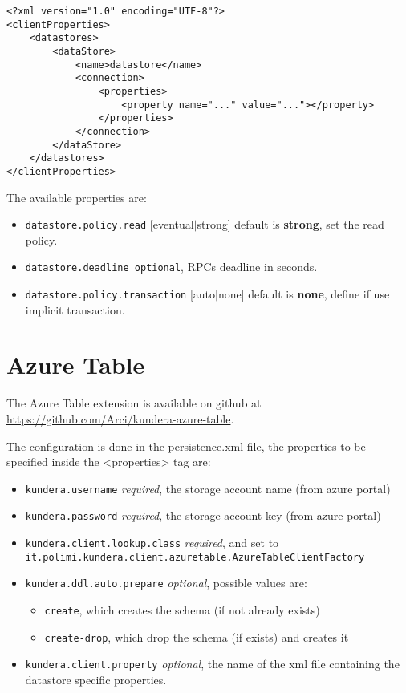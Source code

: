 \begin{verbatim}
<?xml version="1.0" encoding="UTF-8"?>
<clientProperties>
    <datastores>
        <dataStore>
            <name>datastore</name>
            <connection>
                <properties>
                    <property name="..." value="..."></property>
                </properties>
            </connection>
        </dataStore>
    </datastores>
</clientProperties>
\end{verbatim}

\noindent The available properties are:
\begin{itemize}
\item \texttt{datastore.policy.read} [eventual$\vert$strong] default is \textbf{strong}, set the read policy.
\item \texttt{datastore.deadline optional}, RPCs deadline in seconds.
\item \texttt{datastore.policy.transaction} [auto$\vert$none] default is \textbf{none}, define if use implicit transaction.

\end{itemize}

\section{Azure Table}
\label{appendix:table-config}
The Azure Table extension is available on github at \url{https://github.com/Arci/kundera-azure-table}.

\newparagraph The configuration is done in the persistence.xml file, the properties to be specified inside the <properties> tag are:
\begin{itemize}
\item \texttt{kundera.username} \textit{required}, the storage account name (from azure portal)
\item \texttt{kundera.password} \textit{required}, the storage account key (from azure portal)
\item \texttt{kundera.client.lookup.class} \textit{required}, and set to\\\texttt{it.polimi.kundera.client.azuretable.AzureTableClientFactory}
\item \texttt{kundera.ddl.auto.prepare} \textit{optional}, possible values are:
\begin{itemize}
\item \texttt{create}, which creates the schema (if not already exists)
\item \texttt{create-drop}, which drop the schema (if exists) and creates it
\end{itemize}
\item \texttt{kundera.client.property} \textit{optional}, the name of the xml file containing the datastore specific properties.
\end{itemize}

